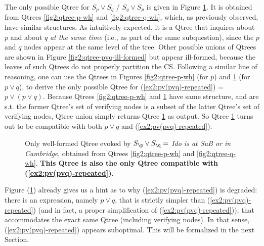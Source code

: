 The only possible Qtree for $S_p \vee S_q$ / $S_q \vee S_p$ is given in Figure \ref{fig2:qtree-pvq}. It is obtained from Qtrees \ref{fig2:qtree-p-wh} and \ref{fig2:qtree-q-wh}, which, as previously observed, have similar structures. As intuitively expected, it is a Qtree that inquires about $p$ and about $q$ \textit{at the same time} (i.e., as part of the same subquestion), since the $p$ and $q$ nodes appear at the same level of the tree. Other possible unions of Qtrees are shown in Figure \ref{fig2:qtree-pvq-ill-formed} but appear ill-formed, because the leaves of such Qtrees do not properly partition the CS. Following a similar line of reasoning, one can use the Qtrees in Figures \ref{fig2:qtree-p-wh} (for $p$) and \ref{fig2:qtree-pvq} (for $p\vee q$), to derive the only possible Qtree for (\ref{ex2:pv(pvq)-repeated}) = $p\vee(p\vee q)$. Because Qtrees \ref{fig2:qtree-p-wh} and  \ref{fig2:qtree-pvq} have same structure, and are s.t. the former Qtree's set of verifying nodes is a subset of the latter Qtree's set of verifying nodes, Qtree union simply returns Qtree \ref{fig2:qtree-pvq} as output. So Qtree \ref{fig2:qtree-pvq} turns out to be compatible with both $p \vee q$ and (\ref{ex2:pv(pvq)-repeated}).

\begin{figure}[H]
	\centering
	\scalebox{1}{
		\begin{forest}
			[CS [\fbox{$\p$}] [\fbox{$\q$}] [\r] [...]]
		\end{forest}
	}
	\caption{Only well-formed Qtree evoked by $S\protect_{\p} \vee S\protect_{\q} =$ \textit{Ido is at SuB or in Cambridge}, obtained from Qtrees \ref{fig2:qtree-p-wh} and \ref{fig2:qtree-q-wh}. \textbf{This Qtree is also the only Qtree compatible with (\ref{ex2:pv(pvq)-repeated})}.}\label{fig2:qtree-pvq}
\end{figure}

Figure (\ref{fig2:qtree-pvq}) already gives us a hint as to why (\ref{ex2:pv(pvq)-repeated}) is degraded: there is an expression, namely $p \vee q$, that is strictly simpler than (\ref{ex2:pv(pvq)-repeated}) (and in fact, a proper simplification of (\ref{ex2:pv(pvq)-repeated})), that accommodates the exact same Qtree (including verifying nodes). In that sense, (\ref{ex2:pv(pvq)-repeated}) appears suboptimal. This will be formalized in the next Section.
 
